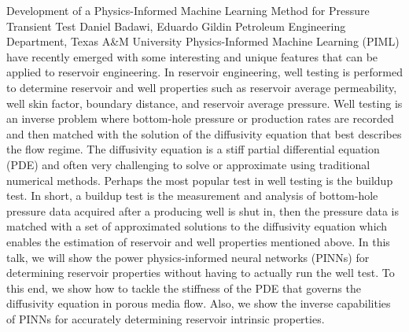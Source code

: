 \begin{addmargin}[2em]{0em}
\vspace{1.5ex}
\abs
{Development of a Physics-Informed Machine Learning Method for Pressure Transient Test}
{Daniel Badawi, Eduardo Gildin}
{Petroleum Engineering Department, Texas A\&M University}
{Physics-Informed Machine Learning (PIML) have recently emerged with some interesting and unique features that can be applied to reservoir engineering. In reservoir engineering, well testing  is performed to determine reservoir and well properties such as reservoir average permeability, well skin factor, boundary distance, and reservoir average pressure. Well testing is an inverse problem where bottom-hole pressure or production rates are recorded and then matched with the solution of the diffusivity equation that best describes the flow regime. The diffusivity equation is a stiff partial differential equation (PDE) and often very challenging to solve or approximate using traditional numerical methods. Perhaps the most popular test in well testing is the buildup test. In short, a buildup test is the measurement and analysis of bottom-hole pressure data acquired after a producing well is shut in, then the pressure data is matched with a set of approximated solutions to the diffusivity equation which enables the estimation of reservoir and well properties mentioned above. In this talk, we will show the power physics-informed neural networks (PINNs) for determining reservoir properties without having to actually run the well test. To this end, we  show how to tackle the stiffness of the PDE that governs the diffusivity equation in porous media flow. Also, we show the inverse capabilities of PINNs for accurately determining reservoir intrinsic properties.}



\end{addmargin}
